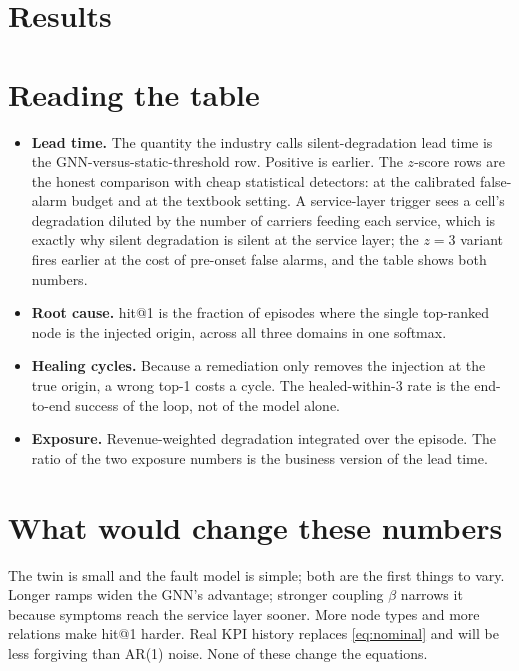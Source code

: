 \section{Results}


\section{Reading the table}
\begin{itemize}[nosep]
  \item \textbf{Lead time.} The quantity the industry calls silent-degradation lead time is the
  GNN-versus-static-threshold row. Positive is earlier. The $z$-score rows are the honest
  comparison with cheap statistical detectors: at the calibrated false-alarm budget and at the
  textbook setting. A service-layer trigger sees a cell's degradation diluted by the number of
  carriers feeding each service, which is exactly why silent degradation is silent at the service
  layer; the $z=3$ variant fires earlier at the cost of pre-onset false alarms, and the table shows
  both numbers.
  \item \textbf{Root cause.} hit@1 is the fraction of episodes where the single top-ranked node is
  the injected origin, across all three domains in one softmax.
  \item \textbf{Healing cycles.} Because a remediation only removes the injection at the true
  origin, a wrong top-1 costs a cycle. The healed-within-3 rate is the end-to-end success of the
  loop, not of the model alone.
  \item \textbf{Exposure.} Revenue-weighted degradation integrated over the episode. The ratio of
  the two exposure numbers is the business version of the lead time.
\end{itemize}

\section{What would change these numbers}
The twin is small and the fault model is simple; both are the first things to vary. Longer ramps
widen the GNN's advantage; stronger coupling $\beta$ narrows it because symptoms reach the service
layer sooner. More node types and more relations make hit@1 harder. Real KPI history replaces
\eqref{eq:nominal} and will be less forgiving than AR(1) noise. None of these change the equations.
